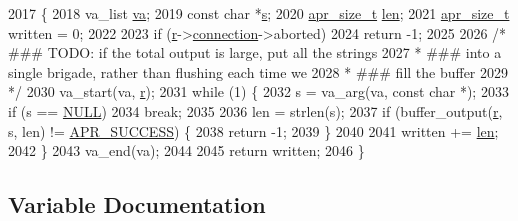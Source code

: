 \begin{DoxyCode}
2017 \{
2018     va\_list \hyperlink{group__APR__Util__Bucket__Brigades_gafa1ac2f9aa9e56e3f87cbc5324a3114f}{va};
2019     \textcolor{keyword}{const} \textcolor{keywordtype}{char} *\hyperlink{group__APACHE__CORE__LISTEN_ga9359ed159c8b295541e3770172d34550}{s};
2020     \hyperlink{group__apr__platform_gaaa72b2253f6f3032cefea5712a27540e}{apr\_size\_t} \hyperlink{group__APACHE__CORE__LOG_gab5a43233d60ef05c5b5bf5cba3d74468}{len};
2021     \hyperlink{group__apr__platform_gaaa72b2253f6f3032cefea5712a27540e}{apr\_size\_t} written = 0;
2022 
2023     \textcolor{keywordflow}{if} (\hyperlink{group__APACHE__CORE__CONFIG_ga091cdd45984e865a888a4f8bb8fe107a}{r}->\hyperlink{structrequest__rec_a0924aae55826638314f76952ca5d60b1}{connection}->aborted)
2024         \textcolor{keywordflow}{return} -1;
2025 
2026     \textcolor{comment}{/* ### TODO: if the total output is large, put all the strings}
2027 \textcolor{comment}{     * ### into a single brigade, rather than flushing each time we}
2028 \textcolor{comment}{     * ### fill the buffer}
2029 \textcolor{comment}{     */}
2030     va\_start(va, \hyperlink{group__APACHE__CORE__CONFIG_ga091cdd45984e865a888a4f8bb8fe107a}{r});
2031     \textcolor{keywordflow}{while} (1) \{
2032         s = va\_arg(va, \textcolor{keyword}{const} \textcolor{keywordtype}{char} *);
2033         \textcolor{keywordflow}{if} (s == \hyperlink{pcre_8txt_ad7f989d16aa8ca809a36bc392c07fba1}{NULL})
2034             \textcolor{keywordflow}{break};
2035 
2036         len = strlen(s);
2037         \textcolor{keywordflow}{if} (buffer\_output(\hyperlink{group__APACHE__CORE__CONFIG_ga091cdd45984e865a888a4f8bb8fe107a}{r}, s, len) != \hyperlink{group__apr__errno_ga9ee311b7bf1c691dc521d721339ee2a6}{APR\_SUCCESS}) \{
2038             \textcolor{keywordflow}{return} -1;
2039         \}
2040 
2041         written += \hyperlink{group__APACHE__CORE__LOG_gab5a43233d60ef05c5b5bf5cba3d74468}{len};
2042     \}
2043     va\_end(va);
2044 
2045     \textcolor{keywordflow}{return} written;
2046 \}
\end{DoxyCode}


\subsection{Variable Documentation}
